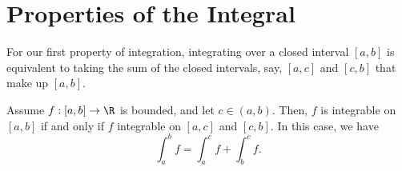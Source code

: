 \section{Properties of the Integral}

For our first property of integration, integrating over a closed interval \( [a,b]  \) is equivalent to taking the sum of the closed intervals, say, \( [a,c]  \) and \( [c,b]  \) that make up \( [a,b]  \).

\begin{tcolorbox}
\begin{thm}
	Assume \( f: [a,b] \to \R   \) is bounded, and let \( c \in (a,b)  \). Then, \( f  \) is integrable on \( [a,b]  \) if and only if \( f  \) integrable on \( [a,c]  \) and \( [c,b]  \). In this case, we have 
	\[  \int_{ a }^{ b } f = \int_{ a }^{ c }  f  + \int_{ b }^{ c }  f. \]
\end{thm}
\end{tcolorbox}

